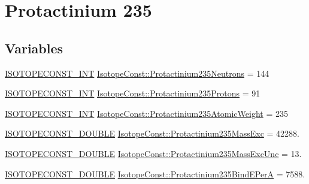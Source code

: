 \hypertarget{group___isotope_const-_protactinium-_pa235}{}\section{Protactinium 235}
\label{group___isotope_const-_protactinium-_pa235}
\subsection*{Variables}
\begin{DoxyCompactItemize}
\item 
\mbox{\hyperlink{group___isotope_const-_macros_ga5f18360b3e99483a35c32d789e62621c}{I\+S\+O\+T\+O\+P\+E\+C\+O\+N\+S\+T\+\_\+\+I\+NT}} \mbox{\hyperlink{group___isotope_const-_protactinium-_pa235_ga5e0c3a1e933ba4377ab3d90fbb937cd6}{Isotope\+Const\+::\+Protactinium235\+Neutrons}} = 144
\item 
\mbox{\hyperlink{group___isotope_const-_macros_ga5f18360b3e99483a35c32d789e62621c}{I\+S\+O\+T\+O\+P\+E\+C\+O\+N\+S\+T\+\_\+\+I\+NT}} \mbox{\hyperlink{group___isotope_const-_protactinium-_pa235_ga44ac646d79508918a32c6eafc1fef5b0}{Isotope\+Const\+::\+Protactinium235\+Protons}} = 91
\item 
\mbox{\hyperlink{group___isotope_const-_macros_ga5f18360b3e99483a35c32d789e62621c}{I\+S\+O\+T\+O\+P\+E\+C\+O\+N\+S\+T\+\_\+\+I\+NT}} \mbox{\hyperlink{group___isotope_const-_protactinium-_pa235_gaabfd10f802b027275f79bfafc2bd5424}{Isotope\+Const\+::\+Protactinium235\+Atomic\+Weight}} = 235
\item 
\mbox{\hyperlink{group___isotope_const-_macros_ga8f45a7272ce02c0b4c65c44636ed719a}{I\+S\+O\+T\+O\+P\+E\+C\+O\+N\+S\+T\+\_\+\+D\+O\+U\+B\+LE}} \mbox{\hyperlink{group___isotope_const-_protactinium-_pa235_ga0dca2e169f029aebb60a7e247cff8e02}{Isotope\+Const\+::\+Protactinium235\+Mass\+Exc}} = 42288.
\item 
\mbox{\hyperlink{group___isotope_const-_macros_ga8f45a7272ce02c0b4c65c44636ed719a}{I\+S\+O\+T\+O\+P\+E\+C\+O\+N\+S\+T\+\_\+\+D\+O\+U\+B\+LE}} \mbox{\hyperlink{group___isotope_const-_protactinium-_pa235_gafe8b67dbd3a8756364ea74343c18b149}{Isotope\+Const\+::\+Protactinium235\+Mass\+Exc\+Unc}} = 13.
\item 
\mbox{\hyperlink{group___isotope_const-_macros_ga8f45a7272ce02c0b4c65c44636ed719a}{I\+S\+O\+T\+O\+P\+E\+C\+O\+N\+S\+T\+\_\+\+D\+O\+U\+B\+LE}} \mbox{\hyperlink{group___isotope_const-_protactinium-_pa235_ga02c5420a6e8907cf96b3507ca16e9a85}{Isotope\+Const\+::\+Protactinium235\+Bind\+E\+PerA}} = 7588.

\end{DoxyCompactItemize}

